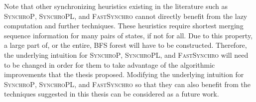 \documentclass[12pt]{article}
\begin{document}
Note that other synchronizing heuristics existing in the literature such as \textsc{SynchroP}, \textsc{SynchroPL}, and \textsc{FastSynchro} cannot directly benefit from the lazy computation and further techniques. 
These heuristics require shortest merging sequence information for many pairs of states, if not for all. Due to this property, a large part of, or the entire, BFS forest
will have to be constructed. Therefore, the underlying intuition for  \textsc{SynchroP}, \textsc{SynchroPL}, and \textsc{FastSynchro} will need to be changed in order for them to take advantage of the algorithmic improvements that the thesis proposed. Modifying the underlying intuition for \textsc{SynchroP}, \textsc{SynchroPL}, and \textsc{FastSynchro} so that they can also benefit from the techniques suggested in this thesis can be considered as a future work.


\clearpage


\end{document}
